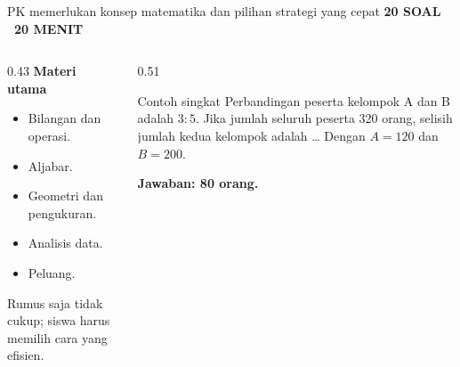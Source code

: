 \documentclass[aspectratio=169,11pt]{beamer}
\newcommand{\kicker}[1]{%
  {\color{StudentCyan}\bfseries\fontsize{10.5}{13}\selectfont\MakeUppercase{#1}}\par\vspace{0.11cm}
}
\newcommand{\answer}[1]{%
  \vspace{0.10cm}
  {\color{StudentGreen}\bfseries\fontsize{11.5}{14}\selectfont Jawaban: #1}
}
\begin{document}
\begin{frame}{PK memerlukan konsep matematika dan pilihan strategi yang cepat}
  \kicker{20 Soal \textbar\ 20 Menit}
  \begin{columns}[T,onlytextwidth]
    \begin{column}{0.43\textwidth}
      {\color{StudentBlue}\bfseries Materi utama}\par
      \begin{itemize}
        \item Bilangan dan operasi.
        \item Aljabar.
        \item Geometri dan pengukuran.
        \item Analisis data.
        \item Peluang.
      \end{itemize}
      \vspace{0.08cm}
      {\color{StudentGray}\fontsize{9.8}{12}\selectfont Rumus saja tidak cukup; siswa harus memilih cara yang efisien.}
    \end{column}
    \begin{column}{0.51\textwidth}
      \begin{block}{Contoh singkat}
        Perbandingan peserta kelompok A dan B adalah $3:5$. Jika jumlah seluruh peserta 320 orang, selisih jumlah kedua kelompok adalah \ldots
        Dengan $A=120$ dan $B=200$.\par
        \answer{80 orang.}
      \end{block}
    \end{column}
  \end{columns}
\end{frame}
\end{document}
